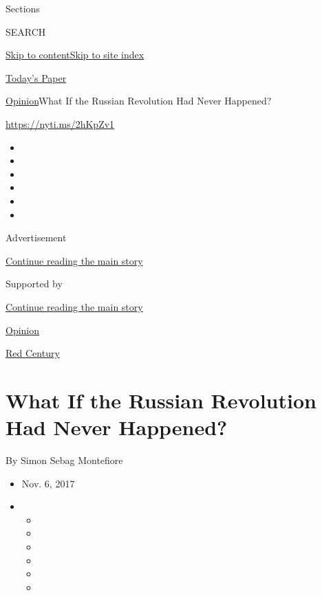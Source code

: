 Sections

SEARCH

\protect\hyperlink{site-content}{Skip to
content}\protect\hyperlink{site-index}{Skip to site index}

\href{https://myaccount.nytimes.com/auth/login?response_type=cookie\&client_id=vi}{}

\href{https://www.nytimes.com/section/todayspaper}{Today's Paper}

\href{/section/opinion}{Opinion}\textbar{}What If the Russian Revolution
Had Never Happened?

\href{https://nyti.ms/2hKpZv1}{https://nyti.ms/2hKpZv1}

\begin{itemize}
\item
\item
\item
\item
\item
\item
\end{itemize}

Advertisement

\protect\hyperlink{after-top}{Continue reading the main story}

Supported by

\protect\hyperlink{after-sponsor}{Continue reading the main story}

\href{/section/opinion}{Opinion}

\href{/column/red-century}{Red Century}

\hypertarget{what-if-the-russian-revolution-had-never-happened}{%
\section{What If the Russian Revolution Had Never
Happened?}\label{what-if-the-russian-revolution-had-never-happened}}

By Simon Sebag Montefiore

\begin{itemize}
\item
  Nov. 6, 2017
\item
  \begin{itemize}
  \item
  \item
  \item
  \item
  \item
  \item
  \end{itemize}
\end{itemize}

